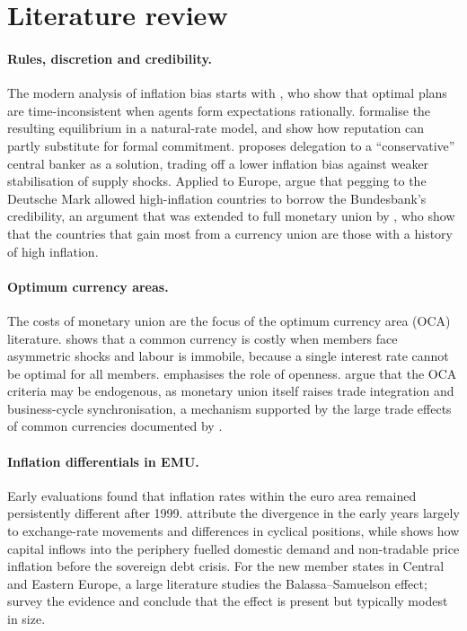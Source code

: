 \documentclass[11pt,a4paper]{article}
\numberwithin{equation}{section}
\theoremstyle{definition}
\theoremstyle{remark}
\begin{document}
\section{Literature review}\label{sec:literature}

\paragraph{Rules, discretion and credibility.} The modern analysis of inflation bias starts with \citet{kydland1977}, who show that optimal plans are time-inconsistent when agents form expectations rationally. \citet{barro1983jpe} formalise the resulting equilibrium in a natural-rate model, and \citet{barro1983jme} show how reputation can partly substitute for formal commitment. \citet{rogoff1985} proposes delegation to a ``conservative'' central banker as a solution, trading off a lower inflation bias against weaker stabilisation of supply shocks. Applied to Europe, \citet{giavazzi1988} argue that pegging to the Deutsche Mark allowed high-inflation countries to borrow the Bundesbank's credibility, an argument that was extended to full monetary union by \citet{alesina2002}, who show that the countries that gain most from a currency union are those with a history of high inflation.

\paragraph{Optimum currency areas.} The costs of monetary union are the focus of the optimum currency area (OCA) literature. \citet{mundell1961} shows that a common currency is costly when members face asymmetric shocks and labour is immobile, because a single interest rate cannot be optimal for all members. \citet{mckinnon1963} emphasises the role of openness. \citet{frankel1998} argue that the OCA criteria may be endogenous, as monetary union itself raises trade integration and business-cycle synchronisation, a mechanism supported by the large trade effects of common currencies documented by \citet{rose2000}.

\paragraph{Inflation differentials in EMU.} Early evaluations found that inflation rates within the euro area remained persistently different after 1999. \citet{honohan2003} attribute the divergence in the early years largely to exchange-rate movements and differences in cyclical positions, while \citet{lane2012} shows how capital inflows into the periphery fuelled domestic demand and non-tradable price inflation before the sovereign debt crisis. For the new member states in Central and Eastern Europe, a large literature studies the Balassa--Samuelson effect; \citet{egert2006} survey the evidence and conclude that the effect is present but typically modest in size.
\end{document}
